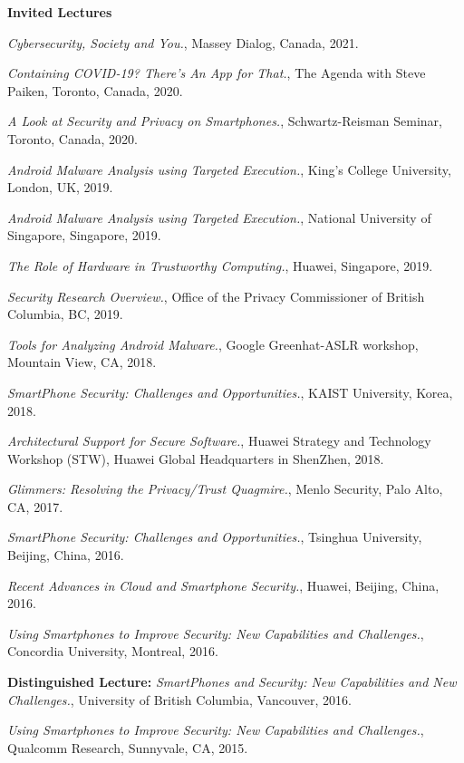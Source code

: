 \documentclass[10pt]{article}
\newenvironment{lonelist}[1][\enskip\textbullet]%
        {\vspace{-\baselineskip}\begin{list}{#1}{%
        \setlength{\partopsep}{0pt}%
        \setlength{\topsep}{0pt}
	\setlength{\leftmargin}{0pt}}}
        {\end{list}\vspace{-.6\baselineskip}}
\newenvironment{innerenum}[1][1.]%
        {\begin{compactenum}[#1]}{\end{compactenum}}
\begin{document}
\begin{lonelist}
\item[] {\bf Invited Lectures}
\begin{innerenum}
\item \textit{Cybersecurity, Society and You.}, Massey Dialog, Canada, 2021.
\item \textit{Containing COVID-19? There's An App for That.}, The Agenda with Steve Paiken, Toronto, Canada, 2020.
\item \textit{A Look at Security and Privacy on Smartphones.}, Schwartz-Reisman Seminar, Toronto, Canada, 2020.
\item \textit{Android Malware Analysis using Targeted Execution.}, King's College University, London, UK, 2019.
\item \textit{Android Malware Analysis using Targeted Execution.}, National University of Singapore, Singapore, 2019.
\item \textit{The Role of Hardware in Trustworthy Computing.}, Huawei, Singapore, 2019.
\item \textit{Security Research Overview.}, Office of the Privacy Commissioner of British Columbia, BC, 2019.	
\item \textit{Tools for Analyzing Android Malware.}, Google Greenhat-ASLR workshop, Mountain View, CA, 2018.
\item {\em SmartPhone Security: Challenges and Opportunities.}, KAIST University, Korea, 2018.
\item {\em Architectural Support for Secure Software.}, Huawei Strategy and Technology Workshop (STW), Huawei Global Headquarters in ShenZhen, 2018.
\item {\em Glimmers: Resolving the Privacy/Trust Quagmire.}, Menlo Security, Palo Alto, CA, 2017.
\item {\em  SmartPhone Security: Challenges and Opportunities.}, Tsinghua University, Beijing, China, 2016.
\item {\em Recent Advances in Cloud and Smartphone Security.}, Huawei, Beijing, China, 2016.
\item {\em Using Smartphones to Improve Security: New Capabilities and Challenges.}, Concordia University, Montreal, 2016.
\item {\bf Distinguished Lecture:} {\em SmartPhones and Security: New Capabilities and New Challenges.}, University of British Columbia, Vancouver, 2016.
\item {\em Using Smartphones to Improve Security: New Capabilities and Challenges.}, Qualcomm Research, Sunnyvale, CA,  2015.

\end{innerenum}
\end{lonelist}
\end{document}
